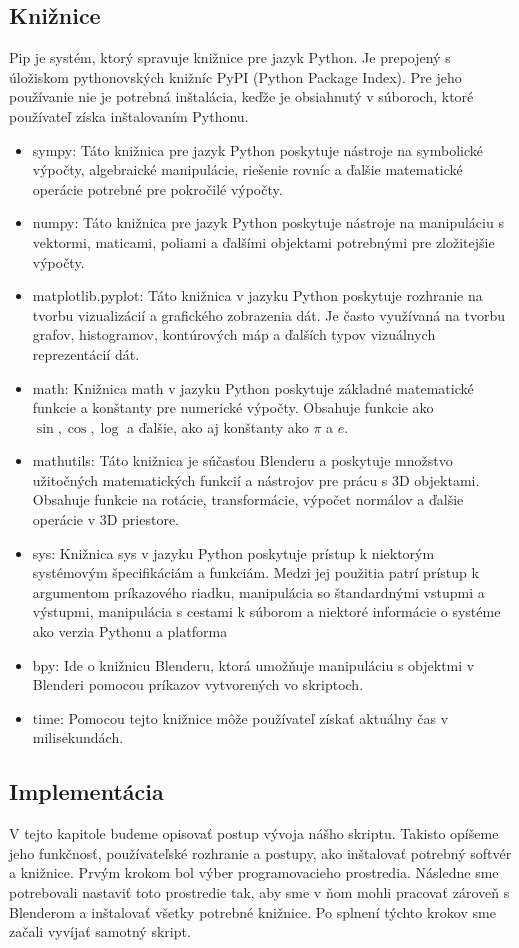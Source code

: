 \subsection{Knižnice}
Pip je systém, ktorý spravuje knižnice pre jazyk Python. Je prepojený s úložiskom
pythonovských knižníc PyPI (Python Package Index). Pre jeho používanie nie je
potrebná inštalácia, keďže je obsiahnutý v súboroch, ktoré používateľ získa inštalovaním
Pythonu.
\begin{itemize}
\item sympy: Táto knižnica pre jazyk Python poskytuje nástroje na symbolické výpočty, algebraické manipulácie, riešenie rovníc a ďalšie matematické operácie potrebné pre pokročilé výpočty.
\item numpy: Táto knižnica pre jazyk Python poskytuje nástroje na manipuláciu s vektormi, maticami, poliami a ďalšími objektami potrebnými pre zložitejšie výpočty.
\item matplotlib.pyplot: Táto knižnica v jazyku Python poskytuje rozhranie na tvorbu vizualizácií a grafického zobrazenia dát. Je často využívaná na tvorbu grafov, histogramov, kontúrových máp a ďalších typov vizuálnych reprezentácií dát.
\item math: Knižnica math v jazyku Python poskytuje základné matematické funkcie a konštanty pre numerické výpočty. Obsahuje funkcie ako $\sin, \cos, \log$ a ďalšie, ako aj konštanty ako $\pi$ a $e$.
\item mathutils: Táto knižnica je súčasťou Blenderu a poskytuje množstvo užitočných matematických funkcií a nástrojov pre prácu s 3D objektami. Obsahuje funkcie na rotácie, transformácie, výpočet normálov a ďalšie operácie v 3D priestore.
\item sys: Knižnica sys v jazyku Python poskytuje prístup k niektorým systémovým špecifikáciám a funkciám. Medzi jej použitia patrí prístup k argumentom príkazového riadku, manipulácia so štandardnými vstupmi a výstupmi, manipulácia s cestami k súborom a niektoré informácie o systéme ako verzia Pythonu a platforma
\item bpy: Ide o knižnicu Blenderu, ktorá umožňuje manipuláciu s objektmi v Blenderi pomocou príkazov vytvorených vo skriptoch.
\item time: Pomocou tejto knižnice môže používateľ získať aktuálny čas v milisekundách. 
\end{itemize}

\subsection{Implementácia}
V tejto kapitole budeme opisovať postup vývoja nášho skriptu. Takisto opíšeme jeho
funkčnosť, používateľské rozhranie a postupy, ako inštalovať potrebný softvér a knižnice.
Prvým krokom bol výber programovacieho prostredia. Následne sme potrebovali
nastaviť toto prostredie tak, aby sme v ňom mohli pracovať zároveň s Blenderom a
inštalovať všetky potrebné knižnice. Po splnení týchto krokov sme začali vyvíjať samotný skript.
